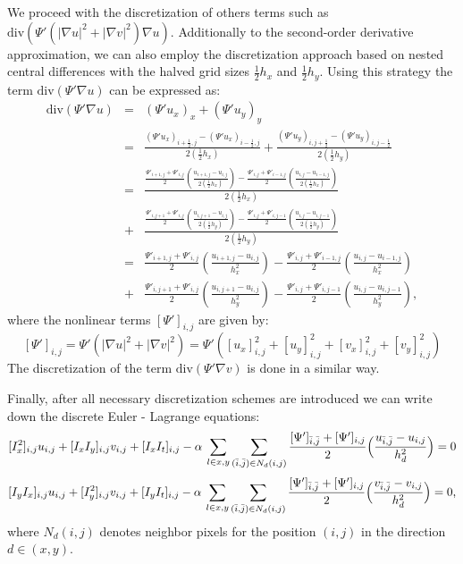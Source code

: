 We proceed with the discretization of others terms such as  $\textrm{div}(\Psi'(|\nabla u|^2 + |\nabla v|^2) \nabla u)$. 
Additionally to the second-order derivative approximation, we can also employ the discretization approach based on nested central differences with the halved grid sizes  $\frac{1}{2}h_x$ and $\frac{1}{2}h_y$.
Using this strategy the term $\textrm{div}(\Psi'\nabla u)$ can be expressed as: 
\begin{eqnarray}
\textrm{div}(\Psi'\nabla u) &=& (\Psi' u_x)_x + (\Psi' u_y)_y \nonumber \\
&=& \frac{ (\Psi' u_x)_{i + \frac{1}{2},j} - (\Psi' u_x)_{i - \frac{1}{2},j} }{2 (\frac{1}{2} h_x)} + 
\frac{ (\Psi' u_y)_{i,j + \frac{1}{2}} - (\Psi' u_y)_{i,j- \frac{1}{2}} }{2 (\frac{1}{2} h_y)} \nonumber \\
&=& \frac{\frac{\Psi'_{i+1,j} + \Psi'_{i,j}}{2} \left ( \frac{u_{i+1,j} - u_{i,j} }{2 (\frac{1}{2} h_x)} \right )   - \frac{\Psi'_{i,j} + \Psi'_{i-1,j}}{2}  \left (\frac{u_{i,j} - u_{i-1,j}}{2 (\frac{1}{2} h_x)} \right ) }  {2 (\frac{1}{2} h_x)} \nonumber \\
&+& \frac{\frac{\Psi'_{i,j+1} + \Psi'_{i,j}}{2} \left (  \frac{u_{i,j+1} - u_{i,j}}{2 (\frac{1}{2} h_y)} \right ) - \frac{\Psi'_{i,j} + \Psi'_{i,j-1}}{2} \left ( \frac{u_{i,j} - u_{i,j-1}}{2 (\frac{1}{2} h_y)} \right ) } {2 (\frac{1}{2} h_y)} \nonumber \\
 &=& \frac{\Psi'_{i+1,j} + \Psi'_{i,j}}{2} \left( \frac{u_{i+1,j} - u_{i,j}}{h^2_x} \right ) - \frac{\Psi'_{i,j} + \Psi'_{i-1,j}}{2} \left ( \frac{u_{i,j} - u_{i-1,j}}{h^2_x} \right ) \nonumber \\
 &+& \frac{\Psi'_{i,j+1} + \Psi'_{i,j}}{2} \left( \frac{u_{i,j+1} - u_{i,j}}{h^2_y} \right ) - \frac{\Psi'_{i,j} + \Psi'_{i,j-1}}{2} \left ( \frac{u_{i,j} - u_{i,j-1}}{h^2_y} \right ), \nonumber
\end{eqnarray}
where the nonlinear terms $[\Psi']_{i,j}$ are given by:
$$ [\Psi']_{i,j} = \Psi'(|\nabla u|^2 + |\nabla v|^2) = \Psi'([u_x]^2_{i,j} + [u_y]^2_{i,j} + [v_x]^2_{i,j} + [v_y]^2_{i,j}) $$ 
The discretization of  the term $\textrm{div}(\Psi'\nabla v)$ is done in a similar way.

Finally, after all necessary discretization schemes are introduced we can write down the discrete Euler - Lagrange equations:
$$ [I^2_x]_{i,j} u_{i,j} + [I_x I_y]_{i,j} v_{i,j} + [I_x I_t]_{i,j} - \alpha \: \sum_{l \in x,y} \sum_{(\bar{i}, \bar{j}) \in N_d(i,j)} \frac{[\Psi']_{\bar{i}, \bar{j}} + [\Psi']_{i,j} }{2} \Bigl (\frac{u_{\bar{i}, \bar{j}} - u_{i,j}  } {h^2_d} \Bigr) = 0 $$
$$ [I_y I_x]_{i,j} u_{i,j} + [I^2_y]_{i,j} v_{i,j} + [I_y I_t]_{i,j} - \alpha \: \sum_{l \in x,y} \sum_{(\bar{i}, \bar{j}) \in N_d(i,j)} \frac{[\Psi']_{\bar{i}, \bar{j}} + [\Psi']_{i,j} }{2} \Bigl (\frac{v_{\bar{i}, \bar{j}} - v_{i,j}  } {h^2_d} \Bigr) = 0, $$
where $N_d(i,j)$ denotes neighbor pixels for the position $(i,j)$ in the direction $d \in (x,y)$.

